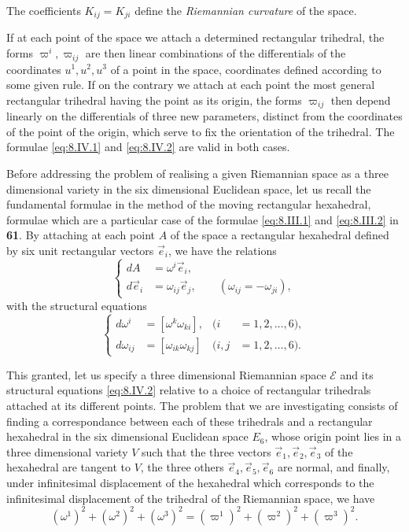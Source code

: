 \documentclass[leqno,11pt]{book}
\numberwithin{equation}{chapter}
\theoremstyle{shape1}
\theoremstyle{shape0}
\theoremstyle{shape2}
\theoremstyle{definition}
\begin{document}
The coefficients $K_{ij}=K_{ji}$ define the \emph{Riemannian curvature} of the space.

If at each point of the space we attach a determined rectangular trihedral, the forms $\varpi^{i},\varpi_{ij}$ are then linear combinations of the differentials of the coordinates $u^{1},u^{2},u^{3}$ of a point in the space, coordinates defined according to some given rule. If on the contrary we attach at each point the most general rectangular trihedral having the point as its origin, the forms $\varpi_{ij}$ then depend linearly on the differentials of three new parameters, distinct from the coordinates of the point of the origin, which serve to fix the orientation of the trihedral.  The formulae \eqref{eq:8.IV.1} and \eqref{eq:8.IV.2} are valid in both cases.

\vspace{12pt}\fsec Before addressing the problem of realising a given Riemannian space as a three dimensional variety in the six dimensional Euclidean space, let us recall the fundamental formulae in the method of the moving rectangular hexahedral, formulae which are a particular case of the formulae \eqref{eq:8.III.1} and \eqref{eq:8.III.2} in \textsection\textbf{61}. By attaching at each point $A$  of the space a rectangular hexahedral defined by six unit rectangular vectors $\vec e_{i}$, we have the relations
\begin{equation}
  \label{eq:8.IV.3}\tag{IV, 3}
  \left\{
    \begin{aligned}
      dA&=\omega^{i}\vec e_{i},\\
      d\vec e_{i}&=\omega_{ij}\vec e_{j},\qquad(\omega_{ij}=-\omega_{ji}),
    \end{aligned}
  \right.
\end{equation}
with the structural equations
\begin{equation}
  \label{eq:8.IV.4}\tag{IV, 4}
  \left\{
    \begin{aligned}
      d\omega^{i}&=[\omega^{k}\omega_{ki}],&(i&=1,2,\dots,6),\\
      d\omega_{ij}&=[\omega_{ik}\omega_{kj}]&(i,j&=1,2,\dots,6).
    \end{aligned}
  \right.
\end{equation}

\vspace{12pt}\fsec This granted, let us specify a three dimensional Riemannian space $\mathcal{E}$ and its structural equations \eqref{eq:8.IV.2} relative to a choice of rectangular trihedrals attached at its different points. The problem that we are investigating consists of finding a correspondance between each of these trihedrals and a rectangular hexahedral in the six dimensional Euclidean space $E_{6}$, whose origin point lies in a three dimensional variety $V$ such that the three vectors $\vec e_{1},\vec e_{2},\vec e_{3}$ of the hexahedral are tangent to $V$, the three others $\vec e_{4},\vec e_{5},\vec e_{6}$ are normal, and finally, under infinitesimal displacement of the hexahedral which corresponds to the infinitesimal displacement of the trihedral of the Riemannian space, we have
\[
(\omega^{1})^{2}+(\omega^{2})^{2}+(\omega^{3})^{2}=(\varpi^{1})^{2}+(\varpi^{2})^{2}+(\varpi^{3})^{2}.
\]
\end{document}
